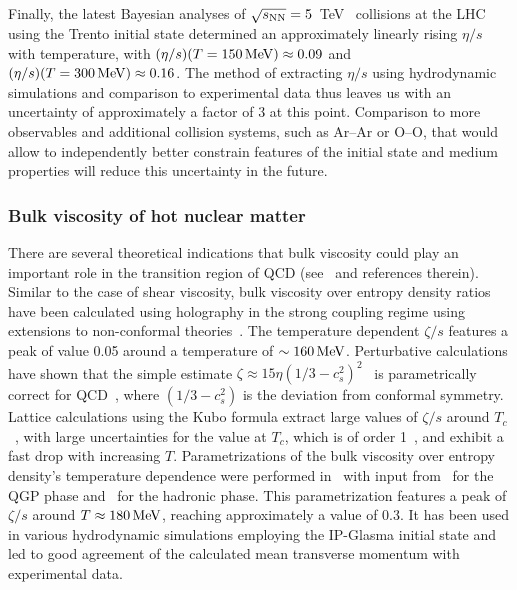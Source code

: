 Finally, the latest Bayesian analyses of $\sqrt{s_{\mathrm{NN}}}=5$~TeV \pbpb\ 
  collisions at the LHC using the Trento initial state determined an 
  approximately linearly rising $\eta/s$ with temperature, with 
  $(\eta/s)(T=150\,{\rm MeV})\approx 0.09$ and 
  $(\eta/s)(T=300\,{\rm MeV})\approx 0.16$.
The method of extracting $\eta/s$ using hydrodynamic simulations and comparison 
  to experimental data thus leaves us with an uncertainty of approximately 
  a factor of $3$ at this point. 
Comparison to more observables and additional collision systems, 
  such as Ar--Ar or O--O, that would allow to independently better constrain 
  features of the initial state and medium properties will reduce this 
  uncertainty in the future. 


\subsubsection{Bulk viscosity of hot nuclear matter}
There are several theoretical indications that bulk viscosity could play 
  an important role in the transition region of QCD (see~\cite{Ryu:2017qzn} 
  and references therein). 
Similar to the case of shear viscosity, bulk viscosity over entropy density 
  ratios have been calculated using holography in the strong coupling regime 
  using extensions to non-conformal theories~\cite{Buchel:2007mf,Finazzo:2014cna}. 
The temperature dependent $\zeta/s$ features a peak of value 0.05 around a 
  temperature of $\sim 160\,{\rm MeV}$. 
Perturbative calculations have shown that the simple estimate 
  $\zeta\approx 15 \eta(1/3-c_s^2)^2$~\cite{Horsley:1985dz} is parametrically 
  correct for QCD~\cite{Arnold:2006fz}, where $(1/3-c_s^2)$ is the deviation 
  from conformal symmetry. 
Lattice calculations using the Kubo formula extract large values of $\zeta/s$ 
  around $T_c$~\cite{Karsch:2007jc,Meyer:2007dy}, with large uncertainties for 
  the value at $T_c$, which is of order 1~\cite{Kharzeev:2007wb}, and exhibit 
  a fast drop with increasing $T$.
Parametrizations of the bulk viscosity over entropy density's temperature 
  dependence were performed in~\cite{Denicol:2009am} with input from~\cite{Karsch:2007jc} 
  for the QGP phase and~\cite{NoronhaHostler:2008ju} for the hadronic phase. 
This parametrization features a peak of $\zeta/s$ around $T\approx 180\,{\rm MeV}$, 
  reaching approximately a value of 0.3. 
It has been used in various hydrodynamic simulations employing the IP-Glasma 
  initial state and led to good agreement of the calculated mean transverse 
  momentum with experimental data. 
